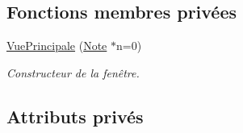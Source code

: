 \subsection*{Fonctions membres privées}
\begin{DoxyCompactItemize}
\item 
\hyperlink{class_vue_principale_aa956c73fa9b92d2031058a42923b58cb}{Vue\-Principale} (\hyperlink{class_note}{Note} $\ast$n=0)
\begin{DoxyCompactList}\small\item\em Constructeur de la fenêtre. \end{DoxyCompactList}\end{DoxyCompactItemize}
\subsection*{Attributs privés}

